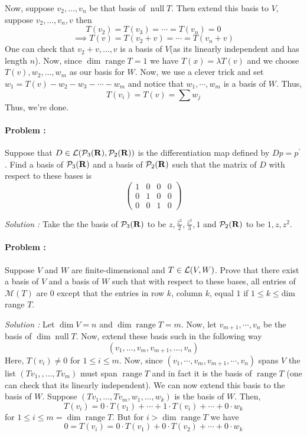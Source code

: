 Now, suppose $v_2, \ldots, v_n$ be that basis of $\operatorname{null} T$. Then extend this basis to $V$, suppose $v_2,\ldots,v_n,v$ then
\[ T(v_2)=T(v_3)= \cdots = T(v_n) = 0 \]
\[ \implies T(v) = T(v_2+v)= \cdots = T(v_n+v) \]
One can check that $v_2+v,\ldots,v$ is a basis of $V$(as its linearly independent and has length $n$). Now, since 
$\dim \operatorname{range} T = 1$ we have $T(x)= \lambda T(v)$ and we choose $T(v),w_2,\ldots,w_m$ as our basis for $W$. Now,
we use a clever trick and set $w_1=T(v)-w_2-w_3- \cdots - w_m$ and notice that $w_1,\cdots,w_m$ is a basis of $W$.  Thus,
\[ T(v_i)=T(v)=\sum w_j \]
Thus, we're done.


\paragraph{Problem :}
Suppose that \(D\in\operatorname{\mathcal{L}}(\mathcal{P}_{3}({\bf R}),\mathcal{P}_{2}({\bf R}))\) is the differentiation map defined by \(Dp=p^{\prime}\). 
Find a basis of \(\mathcal{P}_{3}({\bf R})\) and a basis of \(\mathcal{P}_{2}({\bf R})\) such that the matrix of \(D\) with respect to these 
bases is
\[
\left(\begin{array}{cccc}1&0&0&0\\ 0&1&0&0\\ 0&0&1&0\end{array}\right)
\]

\vspace{4mm}
\textit{Solution :} Take the the basis of  $\mathcal{P}_3({\bf R})$ to be $z,\frac{z^2}{2},\frac{z^3}{3},1$ and $\mathcal{P}_2({{\bf R}})$ to be 
$1,z,z^2$.

\paragraph{Problem :}
Suppose \(V\) and \(W\) are finite-dimensional and \(T\in\operatorname{\mathcal{L}}(V,W)\). Prove that there exist a basis of \(V\) and a basis of \(W\) 
such that with respect to these bases, all entries of \(\mathcal{M}(T)\) are \(0\) except that the entries in row \(k\), column \(k\), equal 
\(1\) if \(1\leq k\leq\text{dim}\) range \(T\).

\vspace{4mm}
\textit{Solution :} Let $\dim V = n$ and $\dim \operatorname{range} T = m$. Now, let $v_{m+1}, \cdots, v_n$ be the basis of 
$\dim \operatorname{null} T$. Now, extend these basis such in the following way
\[ (v_1,\ldots,v_m,v_{m+1},\ldots,v_n) \]
Here, $T(v_i) \neq 0$ for $1 \le i \le m$. Now, since $(v_1,\cdots,v_m,v_{m+1},\cdots,v_n)$ spans $V$ the list $(Tv_1,,\ldots,Tv_m)$ 
must span $\operatorname{range} T$ and in fact it is the basis of $\operatorname{range} T$ (one can check that its linearly independent). 
We can now extend this basis to the basis of $W$. Suppose $(Tv_1,\ldots,Tv_m,w_1,\ldots,w_k)$ is the basis of $W$. Then,
\[ T(v_i) = 0 \cdot T(v_1) + \cdots + 1 \cdot T(v_i) + \cdots + 0 \cdot w_k \]
for $1 \le i \le m = \dim \operatorname{range} T$. But for $i > \dim \operatorname{range} T$ we have
\[ 0=T(v_i)= 0 \cdot T(v_1) + 0 \cdot T(v_2) + \cdots + 0 \cdot w_k \]



